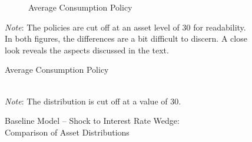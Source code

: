 \documentclass[a4paper,12pt]{article} %
\numberwithin{equation}{section} %
\numberwithin{figure}{section}
\numberwithin{table}{section}
\begin{document}
\begin{refsection}
\begin{appendices}
\begin{figure}[H]
     \vspace{10pt}
     
     \begin{subfigure}[b]{0.75\textwidth}
     \caption{Average Consumption Policy}
     \label{fig:comparison-stst-baseline-wedge-policies-c}
         \centering
         
     \end{subfigure}

    \vspace{10pt}

    \begin{minipage}{0.75\textwidth} 
    \footnotesize
    \textit{Note}: The policies are cut off at an asset level of $30$ for readability. In both figures, the differences are a bit difficult to discern. A close look reveals the aspects discussed in the text.
    \end{minipage}
\end{figure}

\begin{sidewaysfigure}
    \caption{Baseline Model -- Shock to Interest Rate Wedge: \\ Comparison of Asset Distributions}
    \label{fig:comparison-stst-baseline-wedge-dist}
    \centering

    \\
     \centering
	\textit{Note}: The distribution is cut off at a value of $30$.
\end{sidewaysfigure}


\end{appendices}
\end{refsection}
\end{document}
